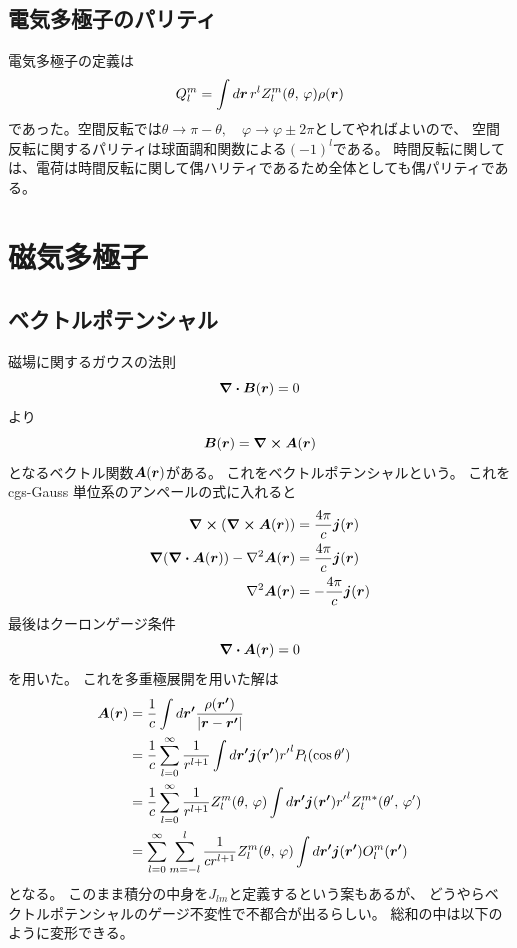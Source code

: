\documentclass[../../master.tex]{subfiles}
\begin{document}
\subsection{電気多極子のパリティ}
電気多極子の定義は
\begin{equation}
    Q_l^m = \int d\vb*{r}\, r^l Z_l^m(\theta,\,\varphi)\rho(\vb*{r})
\end{equation}
であった。空間反転では\(\theta\rightarrow\pi-\theta,\quad\varphi\rightarrow\varphi\pm 2\pi\)としてやればよいので、
空間反転に関するパリティは球面調和関数による\((-1)^l\)である。
時間反転に関しては、電荷は時間反転に関して偶ハリティであるため全体としても偶パリティである。

\section{磁気多極子}
\subsection{ベクトルポテンシャル}
磁場に関するガウスの法則
\begin{equation}
    \div \vb*{B}(\vb*{r}) = 0
\end{equation}
より
\begin{equation}
    \vb*{B}(\vb*{r}) = \curl \vb*{A}(\vb*{r})
\end{equation}
となるベクトル関数\(\vb*{A}(\vb*{r})\)がある。
これをベクトルポテンシャルという。
これを cgs-Gauss 単位系のアンペールの式に入れると
\begin{equation}\begin{aligned}[b]
    \curl (\curl \vb*{A}(\vb*{r})) &= \frac{4\pi}{c} \vb*{j}(\vb*{r})\\
    \grad(\div\vb*{A}(\vb*{r})) - \laplacian \vb*{A}(\vb*{r}) &= \frac{4\pi}{c}\vb*{j}(\vb*{r})\\
    \laplacian \vb*{A}(\vb*{r}) &= -\frac{4\pi}{c}\vb*{j}(\vb*{r})
\end{aligned}\end{equation}
最後はクーロンゲージ条件
\begin{equation}
    \div \vb*{A}(\vb*{r})=0
\end{equation}
を用いた。
これを多重極展開を用いた解は
\begin{equation}\begin{aligned}[b]
    \vb*{A}(\vb*{r})
    &= \frac{1}{c}\int d\vb*{r'} \frac{\rho(\vb*{r'})}{\abs{\vb*{r}-\vb*{r'}}}\\
    &= \frac{1}{c}\sum_{l=0}^{\infty} \frac{1}{r^{l+1}}\int d\vb*{r'} \vb*{j}(\vb*{r'}){r'}^l P_l(\cos\theta')\\
    &= \frac{1}{c}\sum_{l=0}^{\infty} \frac{1}{r^{l+1}} Z_l^m(\theta,\,\varphi)\int d\vb*{r'} \vb*{j}(\vb*{r'}){r'}^l Z_l^{m*}(\theta',\,\varphi')\\
    &= \sum_{l=0}^{\infty} \sum_{m=-l}^{l} \frac{1}{cr^{l+1}}Z_l^m(\theta,\,\varphi) \int d\vb*{r'} \vb*{j}(\vb*{r'}) O_l^{m}(\vb*{r'})
\end{aligned}\end{equation}
となる。
このまま積分の中身を\(J_{lm}\)と定義するという案もあるが、
どうやらベクトルポテンシャルのゲージ不変性で不都合が出るらしい\cite{Stefan2016}。
総和の中は以下のように変形できる。
\end{document}
